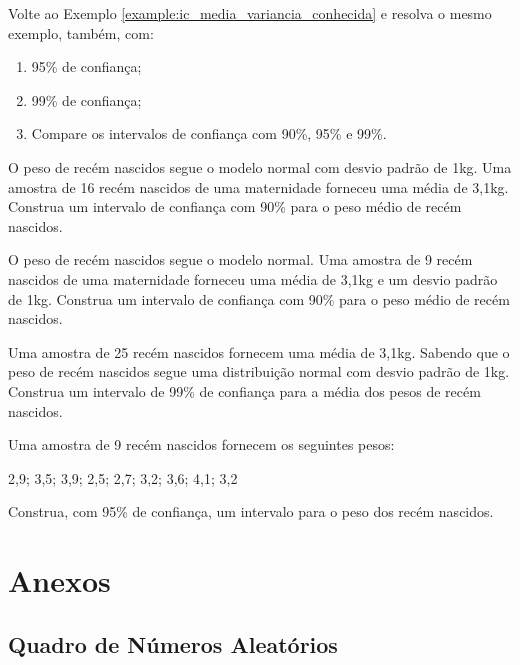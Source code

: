 \documentclass[11pt,fleqn]{book}
\numberwithin{mpicture}{chapter}
\numberwithin{mtable}{chapter}
\numberwithin{mframe}{chapter}
\newcounter{apendix}
\begin{document}
\begin{exercisePage}
	\item Volte ao Exemplo \ref{example:ic_media_variancia_conhecida} e resolva o mesmo exemplo, também, com:
		\begin{enumerate}[label=(\alph*)]
			\item 95\% de confiança;
			\item 99\% de confiança;
			\item Compare os intervalos de confiança com 90\%, 95\% e 99\%.
		\end{enumerate}

	\item O peso de recém nascidos segue o modelo normal com desvio padrão de 1kg. Uma amostra de 16 recém nascidos de uma maternidade forneceu uma média de 3,1kg. Construa um intervalo de confiança com 90\% para o peso médio de recém nascidos.
	
	\item O peso de recém nascidos segue o modelo normal. Uma amostra de 9 recém nascidos de uma maternidade forneceu uma média de 3,1kg e um desvio padrão de 1kg. Construa um intervalo de confiança com 90\% para o peso médio de recém nascidos.
	
	\item Uma amostra de 25 recém nascidos fornecem uma média de 3,1kg. Sabendo que o peso de recém nascidos segue uma distribuição normal com desvio padrão de 1kg. Construa um intervalo de 99\% de confiança para a média dos pesos de recém nascidos.
	
	\item Uma amostra de 9 recém nascidos fornecem os seguintes pesos:
		\begin{center}
			2,9; 3,5; 3,9; 2,5; 2,7; 3,2; 3,6; 4,1; 3,2
		\end{center}
		
		Construa, com 95\% de confiança, um intervalo para o peso dos recém nascidos.
\end{exercisePage}

\part{Anexos}
\nosidepicturearea

\renewcommand{\thechapter}{\Alph{apendix}}


\chapter{Quadro de Números Aleatórios}
\label{anexo:quadro_num_aleatorio}
\end{document}
